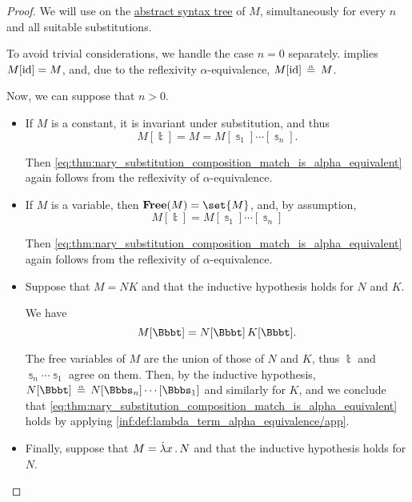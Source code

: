 \begin{proof}
  We will use  on the \hyperref[def:lambda_term_ast]{abstract syntax tree} of \( M \), simultaneously for every \( n \) and all suitable substitutions.

  To avoid trivial considerations, we handle the case \( n = 0 \) separately.  implies \( M[\operatorname{id}] = M \), and, due to the reflexivity \( \alpha \)-equivalence, \( M[\id] \aequiv M \).

  Now, we can suppose that \( n > 0 \).

  \begin{itemize}
    \item If \( M \) is a constant, it is invariant under substitution, and thus
    \begin{equation*}
      M[\Bbbt] = M = M[\Bbbs_1] \cdots [\Bbbs_n].
    \end{equation*}

    Then \eqref{eq:thm:nary_substitution_composition_match_is_alpha_equivalent} again follows from the reflexivity of \( \alpha \)-equivalence.

    \item If \( M \) is a variable, then \( \op*{Free}(M) = \set{ M } \), and, by assumption,
    \begin{equation*}
      M[\Bbbt] = M[\Bbbs_1] \cdots [\Bbbs_n]
    \end{equation*}

    Then \eqref{eq:thm:nary_substitution_composition_match_is_alpha_equivalent} again follows from the reflexivity of \( \alpha \)-equivalence.

    \item Suppose that \( M = NK \) and that the inductive hypothesis holds for \( N \) and \( K \).

    We have
    \begin{equation*}
      M[\Bbbt] = N[\Bbbt] \thinspace K[\Bbbt].
    \end{equation*}

    The free variables of \( M \) are the union of those of \( N \) and \( K \), thus \( \Bbbt \) and \( \Bbbs_n \cdots \Bbbs_1 \) agree on them. Then, by the inductive hypothesis, \( N[\Bbbt] \aequiv N[\Bbbs_n] \cdots [\Bbbs_1] \) and similarly for \( K \), and we conclude that \eqref{eq:thm:nary_substitution_composition_match_is_alpha_equivalent} holds by applying \ref{inf:def:lambda_term_alpha_equivalence/app}.

    \item Finally, suppose that \( M = \qabs x N \) and that the inductive hypothesis holds for \( N \).


\end{itemize}
\end{proof}
